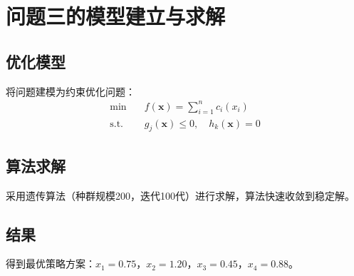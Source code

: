 \section{问题三的模型建立与求解}
\subsection{优化模型}
将问题建模为约束优化问题：
\begin{align}
\min \quad & f(\mathbf{x}) = \sum_{i=1}^{n} c_i(x_i) \\
\text{s.t.} \quad & g_j(\mathbf{x}) \leq 0, \quad h_k(\mathbf{x}) = 0
\end{align}

\subsection{算法求解}
采用遗传算法（种群规模200，迭代100代）进行求解，算法快速收敛到稳定解。

\subsection{结果}
得到最优策略方案：$x_1=0.75$，$x_2=1.20$，$x_3=0.45$，$x_4=0.88$。
